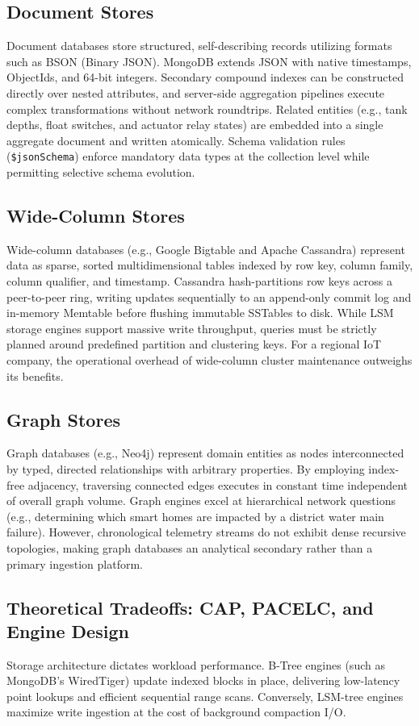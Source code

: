 \documentclass[11pt,a4paper]{article}
\begin{document}
\subsection{Document Stores}
Document databases store structured, self-describing records utilizing formats such as BSON (Binary JSON). MongoDB extends JSON with native timestamps, ObjectIds, and 64-bit integers. Secondary compound indexes can be constructed directly over nested attributes, and server-side aggregation pipelines execute complex transformations without network roundtrips. Related entities (e.g., tank depths, float switches, and actuator relay states) are embedded into a single aggregate document and written atomically. Schema validation rules (\texttt{\$jsonSchema}) enforce mandatory data types at the collection level while permitting selective schema evolution.

\subsection{Wide-Column Stores}
Wide-column databases (e.g., Google Bigtable and Apache Cassandra) represent data as sparse, sorted multidimensional tables indexed by row key, column family, column qualifier, and timestamp. Cassandra hash-partitions row keys across a peer-to-peer ring, writing updates sequentially to an append-only commit log and in-memory Memtable before flushing immutable SSTables to disk. While LSM storage engines support massive write throughput, queries must be strictly planned around predefined partition and clustering keys. For a regional IoT company, the operational overhead of wide-column cluster maintenance outweighs its benefits.

\subsection{Graph Stores}
Graph databases (e.g., Neo4j) represent domain entities as nodes interconnected by typed, directed relationships with arbitrary properties. By employing index-free adjacency, traversing connected edges executes in constant time independent of overall graph volume. Graph engines excel at hierarchical network questions (e.g., determining which smart homes are impacted by a district water main failure). However, chronological telemetry streams do not exhibit dense recursive topologies, making graph databases an analytical secondary rather than a primary ingestion platform.

\subsection{Theoretical Tradeoffs: CAP, PACELC, and Engine Design}
Storage architecture dictates workload performance. B-Tree engines (such as MongoDB's WiredTiger) update indexed blocks in place, delivering low-latency point lookups and efficient sequential range scans. Conversely, LSM-tree engines maximize write ingestion at the cost of background compaction I/O.
\end{document}
